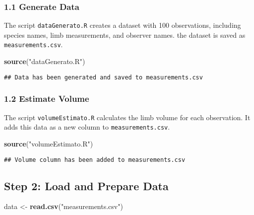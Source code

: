 \documentclass[
]{article}
\newenvironment{Shaded}{\begin{snugshade}}{\end{snugshade}}
\newcommand{\FunctionTok}[1]{\textcolor[rgb]{0.13,0.29,0.53}{\textbf{#1}}}
\newcommand{\NormalTok}[1]{#1}
\newcommand{\OtherTok}[1]{\textcolor[rgb]{0.56,0.35,0.01}{#1}}
\newcommand{\StringTok}[1]{\textcolor[rgb]{0.31,0.60,0.02}{#1}}
\begin{document}
\subsubsection{1.1 Generate Data}\label{generate-data}

The script \texttt{dataGenerato.R} creates a dataset with 100
observations, including species names, limb measurements, and observer
names. the dataset is saved as \texttt{measurements.csv}.

\begin{Shaded}
\begin{Highlighting}[]
\FunctionTok{source}\NormalTok{(}\StringTok{"dataGenerato.R"}\NormalTok{)}
\end{Highlighting}
\end{Shaded}

\begin{verbatim}
## Data has been generated and saved to measurements.csv
\end{verbatim}

\subsubsection{1.2 Estimate Volume}\label{estimate-volume}

The script \texttt{volumeEstimato.R} calculates the limb volume for each
observation. It adds this data as a new column to
\texttt{measurements.csv}.

\begin{Shaded}
\begin{Highlighting}[]
\FunctionTok{source}\NormalTok{(}\StringTok{"volumeEstimato.R"}\NormalTok{)}
\end{Highlighting}
\end{Shaded}

\begin{verbatim}
## Volume column has been added to measurements.csv
\end{verbatim}

\subsection{Step 2: Load and Prepare
Data}\label{step-2-load-and-prepare-data}

\begin{Shaded}
\begin{Highlighting}[]
\NormalTok{data }\OtherTok{\textless{}{-}} \FunctionTok{read.csv}\NormalTok{(}\StringTok{"measurements.csv"}\NormalTok{)}
\end{Highlighting}
\end{Shaded}
\end{document}
